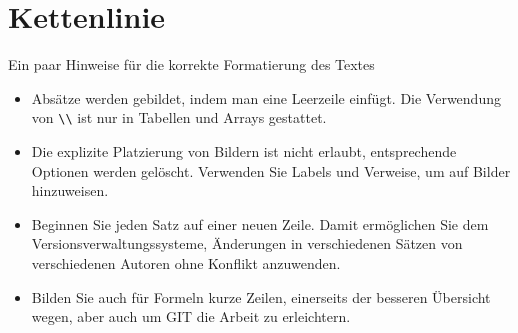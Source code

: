 %
%
%
%
\chapter{Kettenlinie\label{chapter:kettenlinie}}
\begin{refsection}

Ein paar Hinweise für die korrekte Formatierung des Textes
\begin{itemize}
\item
Absätze werden gebildet, indem man eine Leerzeile einfügt.
Die Verwendung von \verb+\\+ ist nur in Tabellen und Arrays gestattet.
\item
Die explizite Platzierung von Bildern ist nicht erlaubt, entsprechende
Optionen werden gelöscht. 
Verwenden Sie Labels und Verweise, um auf Bilder hinzuweisen.
\item
Beginnen Sie jeden Satz auf einer neuen Zeile. 
Damit ermöglichen Sie dem Versionsverwaltungssysteme, Änderungen
in verschiedenen Sätzen von verschiedenen Autoren ohne Konflikt 
anzuwenden.
\item 
Bilden Sie auch für Formeln kurze Zeilen, einerseits der besseren
Übersicht wegen, aber auch um GIT die Arbeit zu erleichtern.
\end{itemize}






\printbibliography[heading=subbibliography]
\end{refsection}
